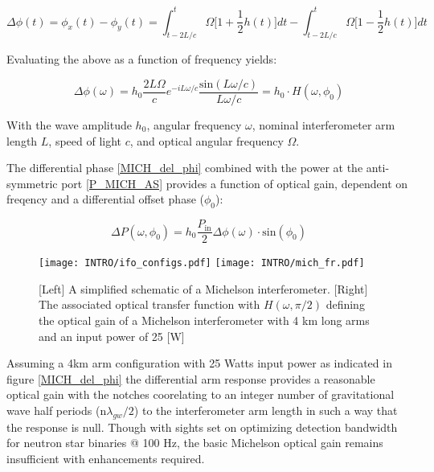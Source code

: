 \begin{equation}
\Delta \phi(t) = \phi_x(t) - \phi_y(t) =  \int_{t-2L/c}^{t} \Omega \bigg[1 + \frac{1}{2}h(t)\bigg]dt - \int_{t-2L/c}^{t} \Omega \bigg[1 - \frac{1}{2}h(t)\bigg]dt 
\end{equation}

Evaluating the above as a function of frequency yields:

\begin{equation}\label{MICH_del_phi}
	\Delta \phi (\omega) = h_0\frac{2 L \Omega}{c}e^{-i L \omega / c} \frac{\mathrm{sin}(L \omega /c)}{L \omega /c} = h_0 \cdot H(\omega, \phi_0)
\end{equation}

With the wave amplitude $h_0$, angular frequency $\omega$, nominal interferometer arm length $L$, speed of light $c$, and optical angular frequency $\Omega$.

The differential phase \ref{MICH_del_phi} combined with the power at the anti-symmetric port \ref{P_MICH_AS} provides a function of optical gain, dependent on freqency and a differential offset phase ($\phi_0$):

\begin{equation}
	\Delta P(\omega, \phi_0) = h_0 \frac{P_\mathrm{in}}{2} \Delta \phi (\omega) \cdot \mathrm{sin}(\phi_0)
\end{equation}

\begin{figure}[ht!]
	\begin{subcaptiongroup}
		\texttt{[image: INTRO/ifo\_configs.pdf]}
		\texttt{[image: INTRO/mich\_fr.pdf]}
 	\end{subcaptiongroup}
  	\hfill
	\caption{[Left] A simplified schematic of a Michelson interferometer. [Right] The associated optical transfer function with $H(\omega, \pi/2)$ defining the optical gain of a Michelson interferometer with 4 km long arms and an input power of 25 [W]}
	\label{fig:mich}
\end{figure}
\FloatBarrier

Assuming a 4km arm configuration with 25 Watts input power as indicated in figure \ref{MICH_del_phi} the differential arm response provides a reasonable optical gain with the notches coorelating to an integer number of gravitational wave half periods ($\mathrm{n}\lambda_{gw} / 2$) to the interferometer arm length in such a way that the response is null. Though with sights set on optimizing detection bandwidth for neutron star binaries @ 100 Hz, the basic Michelson optical gain remains insufficient with enhancements required.  

